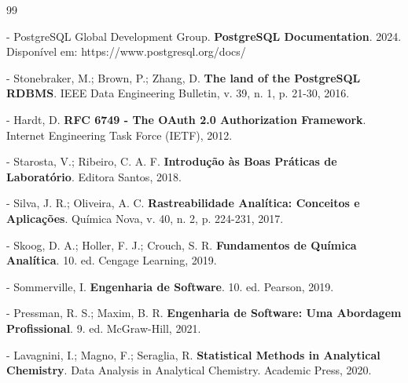 \documentclass[12pt,a4paper]{article}
\providecommand\关键字[1]{\textbf{#1}}
\begin{document}
\begin{thebibliography}{99}

- PostgreSQL Global Development Group. \textbf{PostgreSQL Documentation}. 2024. Disponível em: https://www.postgresql.org/docs/

- Stonebraker, M.; Brown, P.; Zhang, D. \textbf{The land of the PostgreSQL RDBMS}. IEEE Data Engineering Bulletin, v. 39, n. 1, p. 21-30, 2016.

- Hardt, D. \textbf{RFC 6749 - The OAuth 2.0 Authorization Framework}. Internet Engineering Task Force (IETF), 2012.


- Starosta, V.; Ribeiro, C. A. F. \textbf{Introdução às Boas Práticas de Laboratório}. Editora Santos, 2018.

- Silva, J. R.; Oliveira, A. C. \textbf{Rastreabilidade Analítica: Conceitos e Aplicações}. Química Nova, v. 40, n. 2, p. 224-231, 2017.

- Skoog, D. A.; Holler, F. J.; Crouch, S. R. \textbf{Fundamentos de Química Analítica}. 10. ed. Cengage Learning, 2019.


- Sommerville, I. \textbf{Engenharia de Software}. 10. ed. Pearson, 2019.

- Pressman, R. S.; Maxim, B. R. \textbf{Engenharia de Software: Uma Abordagem Profissional}. 9. ed. McGraw-Hill, 2021.


- Lavagnini, I.; Magno, F.; Seraglia, R. \textbf{Statistical Methods in Analytical Chemistry}. Data Analysis in Analytical Chemistry. Academic Press, 2020.

\end{thebibliography}

\end{document}
